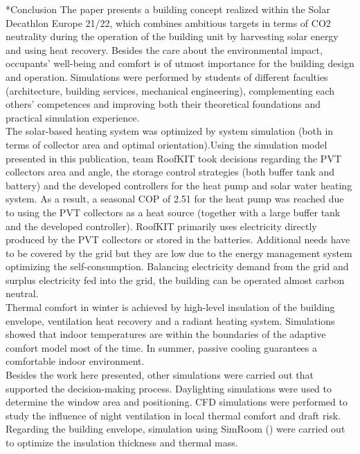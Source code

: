 \documentclass[twocolumn, a4paper,10pt]{article}
\makeatletter
\renewcommand\section{\@startsection{section}{1}{\z@}{3pt}{3pt}{\normalfont\large\bfseries}}
\makeatother
\begin{document}
\section*{Conclusion}
The paper presents a building concept realized within the Solar Decathlon Europe 21/22, which combines ambitious targets in terms of CO2 neutrality during the operation of the building unit by harvesting solar energy and using heat recovery. Besides the care about the environmental impact, occupants' well-being and comfort is of utmost importance for the building design and operation. Simulations were performed by students of different faculties (architecture, building services, mechanical engineering), complementing each others' competences and improving both their theoretical foundations and practical simulation experience. \\
The solar-based heating system was optimized by system simulation (both in terms of collector area and optimal orientation).Using the simulation model presented in this publication, team RoofKIT took decisions regarding the PVT collectors area and angle, the storage control strategies (both buffer tank and battery) and the developed controllers for the heat pump and solar water heating system. As a result, a seasonal COP of 2.51 for the heat pump was reached due to using the PVT collectors as a heat source (together with a large buffer tank and the developed controller). RoofKIT primarily uses electricity directly produced by the PVT collectors or stored in the batteries. Additional needs have to be covered by the grid but they are low due to the energy management system optimizing the self-consumption. Balancing electricity demand from the grid and surplus electricity fed into the grid, the building can be operated almost carbon neutral. \\
Thermal comfort in winter is achieved by high-level insulation of the building envelope, ventilation heat recovery and a radiant heating system. Simulations showed that indoor temperatures are within the boundaries of the adaptive comfort model most of the time. In summer, passive cooling guarantees a comfortable indoor environment.\\
Besides the work here presented, other simulations were carried out that supported the decision-making process. Daylighting simulations were used to determine the window area and positioning. CFD simulations were performed to study the influence of night ventilation in local thermal comfort and draft risk. Regarding the building envelope, simulation using SimRoom (\citeyear{SimRoom2022}) were carried out to optimize the insulation thickness and thermal mass.\\
\end{document}
